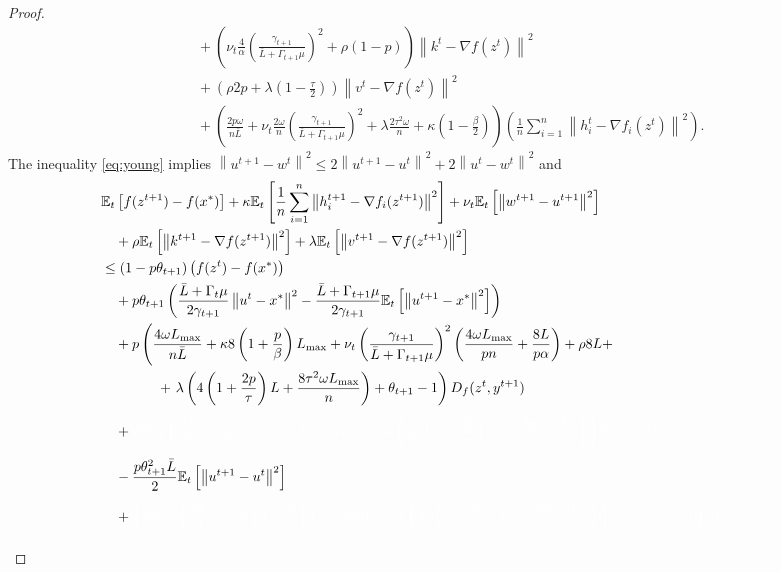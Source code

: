 \documentclass{article} %
\newcommand{\norm}[1]{\left\| #1 \right\|}
\newcommand{\ExpSub}[2]{{\mathbb{E}}_{#1}\left[#2\right]}
\theoremstyle{plain}
\theoremstyle{definition}
\theoremstyle{remark}
\newcommand{\red}{\color{mydarkred}}
\begin{document}
\begin{proof}
\begin{align*}
    &\quad + \left(\nu_{t} \frac{4}{\alpha} \left(\frac{\gamma_{t+1}}{\bar{L} + \Gamma_{t+1} \mu}\right)^2 + \rho (1 - p)\right) \norm{k^{t} - \nabla f(z^t)}^2 \\
    &\quad + \left(\rho 2 p + \lambda \left(1 - \frac{\tau}{2}\right)\right) \norm{v^{t} - \nabla f(z^t)}^2 \\
    &\quad + \left(\frac{2 p \omega}{n \bar{L}} + \nu_{t} \frac{2 \omega}{n} \left(\frac{\gamma_{t+1}}{\bar{L} + \Gamma_{t+1} \mu}\right)^2 + \lambda \frac{2 \tau^2 \omega}{n} + \kappa \left(1 - \frac{\beta}{2}\right)\right) \left(\frac{1}{n}\sum_{i=1}^n \norm{h_i^t - \nabla f_i(z^{t})}^2\right).
  \end{align*}
  The inequality \eqref{eq:young} implies $\norm{u^{t+1} - w^t}^2 \leq 2 \norm{u^{t+1} - u^{t}}^2 + 2 \norm{u^{t} - w^{t}}^2$ and
  \begin{align*}
    &\ExpSub{t}{f(z^{t+1}) - f(x^*)} + \kappa \ExpSub{t}{\frac{1}{n}\sum_{i=1}^n \norm{h_i^{t+1} - \nabla f_i(z^{t+1})}^2} + \nu_{t} \ExpSub{t}{\norm{w^{t+1} - u^{t+1}}^2}\\
    &\quad  + \rho \ExpSub{t}{\norm{k^{t+1} - \nabla f(z^{t+1})}^2} + \lambda \ExpSub{t}{\norm{v^{t+1} - \nabla f(z^{t+1})}^2}\\
    &\leq (1 - p\theta_{t+1}) \left(f(z^{t}) - f(x^*)\right) \\
    &\quad+ p\theta_{t+1} \left(\frac{\bar{L} + \Gamma_{t} \mu}{2 \gamma_{t+1}} \norm{u^t - x^*}^2 - \frac{\bar{L} + \Gamma_{t+1} \mu}{2 \gamma_{t+1}} \ExpSub{t}{\norm{u^{t+1} - x^*}^2}\right) \\
    &\quad+ p\left(\frac{4 \omega L_{\max}}{n \bar{L}} + \kappa 8 \left(1 + \frac{p}{\beta}\right) L_{\max} + \nu_{t} \left(\frac{\gamma_{t+1}}{\bar{L} + \Gamma_{t+1} \mu}\right)^2\left(\frac{4 \omega L_{\max}}{p n} + \frac{8L}{p \alpha}\right) + \rho 8 L +  \right. \\
    &\qquad\qquad+ \left. \lambda \left(4 \left(1 + \frac{2 p}{\tau}\right) L + \frac{8 \tau^2 \omega L_{\max}}{n}\right) + \theta_{t+1} - 1\right) D_f(z^t, y^{t+1}) \\
    &\quad+ \red{2 \theta_{t+1}^2 \left(\frac{pL}{2} + \kappa 4 p \left(1 + \frac{p}{\beta}\right) \widehat{L}^2 + \rho 4 p L^2 + \lambda \left(2 p \left(1 + \frac{2 p}{\tau}\right) L^2 + \frac{4 p \tau^2 \omega \widehat{L}^2}{n}\right) \right) \ExpSub{t}{\norm{u^{t+1} - u^t}^2}} \\
    &\quad - \frac{p \theta_{t+1}^2 \bar{L}}{2} \ExpSub{t}{\norm{u^{t+1} - u^t}^2} \\
    &\quad + \red{\left(2 \theta_{t+1}^2 \left(\frac{pL}{2} + \kappa 4 p \left(1 + \frac{p}{\beta}\right) \widehat{L}^2 + \rho 4 p L^2 + \lambda \left(2 p \left(1 + \frac{2 p}{\tau}\right) L^2 + \frac{4 p \tau^2 \omega \widehat{L}^2}{n}\right) \right) + \nu_{t} \left(1 - \frac{\alpha}{2}\right)\right) \norm{w^t - u^t}^2} \\

\end{align*}
\end{proof}
\end{document}
